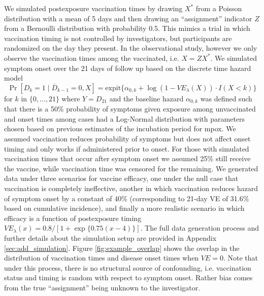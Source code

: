 \documentclass[11pt]{article}
\begin{document}
We simulated postexposure vaccination times by drawing $X^*$ from a Poisson distribution with a mean of 5 days and then drawing an ``assignment'' indicator $Z$ from a Bernoulli distribution with probability 0.5. This mimics a trial in which vaccination timing is not controlled by investigators, but participants are randomized on the day they present. In the observational study, however we only observe the vaccination times among the vaccinated, i.e. $X = ZX^* $. We simulated symptom onset over the 21 days of follow up based on the discrete time hazard model 
$$\Pr[D_k = 1 \mid \overline{D}_{k-1} = 0, X] =  \text{expit}\{\alpha_{0,k} + \log(1 - VE_{\lambda}(X)) \cdot I(X < k)\}$$
for $k$ in $\{0, \ldots, 21\}$ where $Y = D_{21}$ and the baseline hazard $\alpha_{0,k}$ was defined such that there is a 50\% probability of symptoms given exposure among unvaccinated and onset times among cases had a Log-Normal distribution with parameters chosen based on previous estimates of the incubation period for mpox. We assumed vaccination reduces probability of symptoms but does not affect onset timing and only works if administered prior to onset. For those with simulated vaccination times that occur after symptom onset we assumed 25\% still receive the vaccine, while vaccination time was censored for the remaining. We generated data under three scenarios for vaccine efficacy, one under the null case that vaccination is completely ineffective, another in which vaccination reduces hazard of symptom onset by a constant of 40\% (corresponding to 21-day VE of 31.6\% based on cumulative incidence), and finally a more realistic scenario in which efficacy is a function of postexposure timing $VE_{\lambda}(x) = 0.8/[1+\exp\{0.75(x-4)\}]$. The full data generation process and further details about the simulation setup are provided in Appendix \ref{sec:add_simulation}. Figure \ref{fig:example_overlap} shows the overlap in the distribution of vaccination times and disease onset times when $VE = 0$.   Note that under this process, there is no structural source of confounding, i.e. vaccination status and timing is random with respect to symptom onset.   Rather bias comes from the true ``assignment'' being unknown to the investigator.
\end{document}
